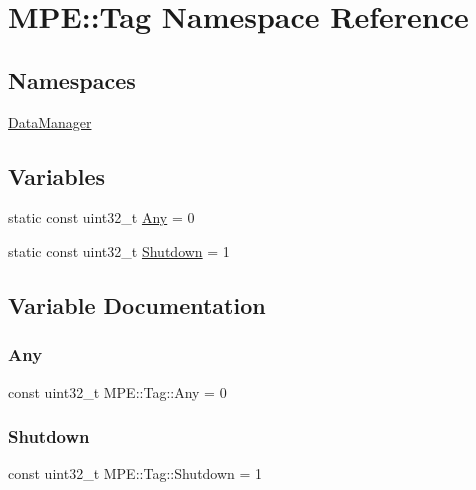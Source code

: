 \hypertarget{namespace_m_p_e_1_1_tag}{}\section{M\+PE\+:\+:Tag Namespace Reference}
\label{namespace_m_p_e_1_1_tag}
\subsection*{Namespaces}
\begin{DoxyCompactItemize}
\item 
 \hyperlink{namespace_m_p_e_1_1_tag_1_1_data_manager}{Data\+Manager}
\end{DoxyCompactItemize}
\subsection*{Variables}
\begin{DoxyCompactItemize}
\item 
static const uint32\+\_\+t \hyperlink{namespace_m_p_e_1_1_tag_aa5b0456e2af78c51452dd5a5a9b39b8c}{Any} = 0
\item 
static const uint32\+\_\+t \hyperlink{namespace_m_p_e_1_1_tag_abc1f55c07827fa1883742f19dba494a4}{Shutdown} = 1
\end{DoxyCompactItemize}


\subsection{Variable Documentation}
\mbox{\label{namespace_m_p_e_1_1_tag_aa5b0456e2af78c51452dd5a5a9b39b8c}} 
\subsubsection{\texorpdfstring{Any}{Any}}
{\footnotesize\ttfamily const uint32\+\_\+t M\+P\+E\+::\+Tag\+::\+Any = 0\hspace{0.3cm}{\ttfamily [static]}}

\mbox{\label{namespace_m_p_e_1_1_tag_abc1f55c07827fa1883742f19dba494a4}} 
\subsubsection{\texorpdfstring{Shutdown}{Shutdown}}
{\footnotesize\ttfamily const uint32\+\_\+t M\+P\+E\+::\+Tag\+::\+Shutdown = 1\hspace{0.3cm}{\ttfamily [static]}}

